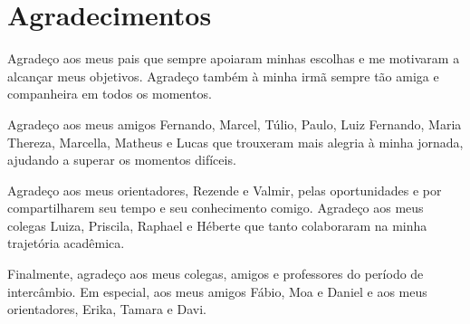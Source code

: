 \chapter*{Agradecimentos}

Agradeço aos meus pais que sempre apoiaram minhas escolhas e me motivaram a alcançar meus objetivos. Agradeço também à minha irmã sempre tão amiga e companheira em todos os momentos.

Agradeço aos meus amigos Fernando, Marcel, Túlio, Paulo, Luiz Fernando, Maria Thereza, Marcella, Matheus e Lucas que trouxeram mais alegria à minha jornada, ajudando a superar os momentos difíceis.

Agradeço aos meus orientadores, Rezende e Valmir, pelas oportunidades e por compartilharem seu tempo e seu conhecimento comigo. Agradeço aos meus colegas Luiza, Priscila, Raphael e Héberte que tanto colaboraram na minha trajetória acadêmica.

Finalmente, agradeço aos meus colegas, amigos e professores do período de intercâmbio. Em especial, aos meus amigos Fábio, Moa e Daniel e aos meus orientadores, Erika, Tamara e Davi.
